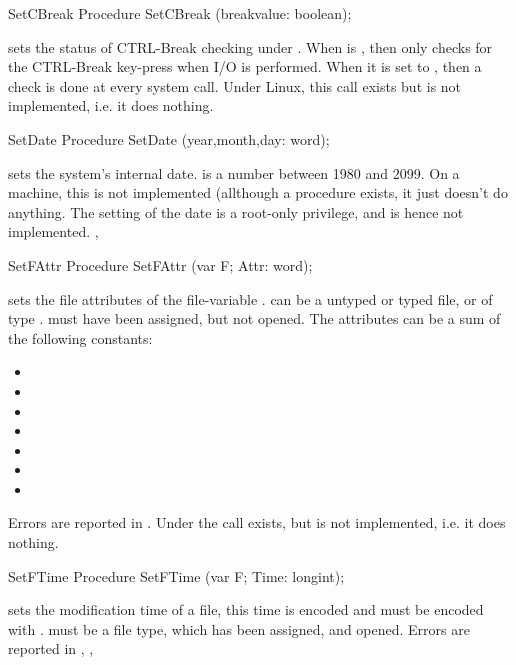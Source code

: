 
\begin{procedure}{SetCBreak}
\Declaration
Procedure SetCBreak (breakvalue: boolean);
\Description

 sets the status of CTRL-Break checking under \dos.
When  is , then \dos only checks for the 
CTRL-Break key-press when I/O is performed. When it is set to ,
then a check is done at every system call.
\Errors
Under Linux, this call exists
but is not implemented, i.e. it does nothing.
\SeeAlso
{}
\end{procedure}
\begin{procedure}{SetDate}
\Declaration
Procedure SetDate (year,month,day: word);
\Description

 sets the system's internal date.  is a number
between 1980 and 2099.
\Errors
On a \linux  machine, this is not implemented (allthough a procedure
exists, it just doesn't do anything. The setting of the date is a
root-only privilege, and is hence not implemented.
\SeeAlso
{},
\end{procedure}

\begin{procedure}{SetFAttr}
\Declaration
Procedure SetFAttr (var F; Attr: word);
\Description

 sets the file attributes of the file-variable .
  can be a untyped or typed file, or of type .  must
have been assigned, but not opened. The attributes can be a sum of the
following constants:
\begin{itemize}
\item {}
\item {}
\item {}
\item {}
\item {}
\item {}
\item {}
\end{itemize}

\Errors
Errors are reported in .
Under \linux the call exists, but is not implemented, i.e. it does nothing.
\SeeAlso
{}
\end{procedure}
\begin{procedure}{SetFTime}
\Declaration
Procedure SetFTime (var F; Time: longint);
\Description

 sets the modification time of a file,
this time is encoded and must be encoded with . 
 must be a file type, which has been assigned, and
opened.
\Errors
Errors are reported in 
\SeeAlso
{}, ,
\end{procedure}


